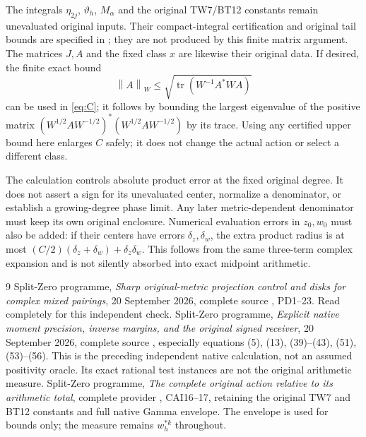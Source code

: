 \documentclass[11pt]{article}
\newcommand{\tr}{\operatorname{tr}}
\newcommand{\norm}[1]{\left\lVert#1\right\rVert}
\begin{document}
The integrals $\eta_{2j}$, $\vartheta_h$, $M_\alpha$ and the
original TW7/BT12 constants remain unevaluated original inputs.
Their compact-integral certification and original tail bounds
are specified in \cite{NP}; they are not produced by this finite
matrix argument. The matrices $J,A$ and the fixed class $x$ are
likewise their original data. If desired, the finite exact bound
\[
 \norm{A}_W\le\sqrt{\tr(W^{-1}A^*WA)}
\]
can be used in \eqref{eq:C}; it follows by bounding the largest
eigenvalue of the positive matrix
$(W^{1/2}AW^{-1/2})^*(W^{1/2}AW^{-1/2})$ by its trace.
Using any certified upper bound here enlarges $C$ safely; it does
not change the actual action or select a different class.

The calculation controls absolute product error at the fixed
original degree. It does not assert a sign for its unevaluated
center, normalize a denominator, or establish a growing-degree
phase limit. Any later metric-dependent denominator must keep its
own original enclosure. Numerical evaluation errors in $z_0,w_0$
must also be added: if their centers have errors $\delta_z,
\delta_w$, the extra product radius is at most
$(C/2)(\delta_z+\delta_w)+\delta_z\delta_w$. This follows
from the same three-term complex expansion and is not silently
absorbed into exact midpoint arithmetic.

\begin{thebibliography}{9}
 Split-Zero programme,
\emph{Sharp original-metric projection control and disks for complex
mixed pairings}, 20 September 2026, complete source
,
PD1--23. Read completely for this independent check.
 Split-Zero programme,
\emph{Explicit native moment precision, inverse margins, and the
original signed receiver}, 20 September 2026, complete source
,
especially equations (5), (13), (39)--(43), (51), (53)--(56).
This is the preceding independent native calculation, not an
assumed positivity oracle. Its exact rational test instances are
not the original arithmetic measure.
 Split-Zero programme,
\emph{The complete original action relative to its arithmetic total},
complete provider , CAI16--17,
retaining the original TW7 and BT12 constants and full native
Gamma envelope. The envelope is used for bounds only; the
measure remains $w_h^{*k}$ throughout.
\end{thebibliography}
\end{document}
